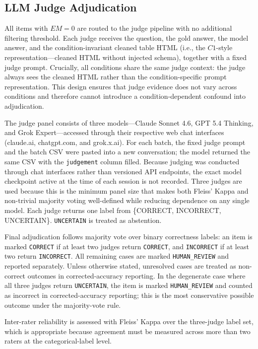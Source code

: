 ﻿\documentclass[a4paper]{article}
\begin{document}
\subsection{LLM Judge Adjudication}

All items with \(EM = 0\) are routed to the judge pipeline with no additional filtering threshold. Each judge receives the question, the gold answer, the model answer, and the condition-invariant cleaned table HTML (i.e., the \(C1\)-style representation---cleaned HTML without injected schema), together with a fixed judge prompt. Crucially, all conditions share the same judge context: the judge always sees the cleaned HTML rather than the condition-specific prompt representation. This design ensures that judge evidence does not vary across conditions and therefore cannot introduce a condition-dependent confound into adjudication.

The judge panel consists of three models---Claude Sonnet 4.6, GPT 5.4 Thinking, and Grok Expert---accessed through their respective web chat interfaces (claude.ai, chatgpt.com, and grok.x.ai). For each batch, the fixed judge prompt and the batch CSV were pasted into a new conversation; the model returned the same CSV with the \texttt{judgement} column filled. Because judging was conducted through chat interfaces rather than versioned API endpoints, the exact model checkpoint active at the time of each session is not recorded. Three judges are used because this is the minimum panel size that makes both Fleiss' Kappa and non-trivial majority voting well-defined while reducing dependence on any single model. Each judge returns one label from \{CORRECT, INCORRECT, UNCERTAIN\}. \texttt{UNCERTAIN} is treated as abstention.

Final adjudication follows majority vote over binary correctness labels: an item is marked \texttt{CORRECT} if at least two judges return \texttt{CORRECT}, and \texttt{INCORRECT} if at least two return \texttt{INCORRECT}. All remaining cases are marked \texttt{HUMAN\_REVIEW} and reported separately. Unless otherwise stated, unresolved cases are treated as non-correct outcomes in corrected-accuracy reporting. In the degenerate case where all three judges return \texttt{UNCERTAIN}, the item is marked \texttt{HUMAN\_REVIEW} and counted as incorrect in corrected-accuracy reporting; this is the most conservative possible outcome under the majority-vote rule.

Inter-rater reliability is assessed with Fleiss' Kappa over the three-judge label set, which is appropriate because agreement must be measured across more than two raters at the categorical-label level.
\end{document}

